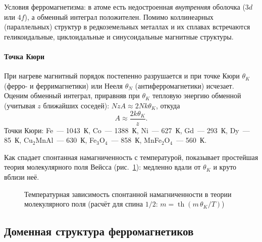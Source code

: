 \begin{glavnoe}
Условия ферромагнетизма: в атоме есть недостроенная \emph{внутренняя}
оболочка ($3d$ или $4f$), а обменный интеграл положителен. Помимо
коллинеарных (параллельных) структур в редкоземельных металлах и их
сплавах встречаются геликоидальные, циклоидальные и синусоидальные
магнитные структуры.
\end{glavnoe}

\paragraph{Точка Кюри}
При нагреве магнитный порядок постепенно разрушается и при точке Кюри
$\theta_K$ (ферро- и ферримагнетики) или Нееля $\theta_N$
(антиферромагнетики) исчезает. Оценим обменный интеграл, приравняв при
$\theta_K$ тепловую энергию обменной (учитывая $z$ ближайших соседей):
$NzA\approx2Nk\theta_K$, откуда
\begin{equation}\label{eq:A-curie}
A\approx\frac{2k\theta_K}z .
\end{equation}
Точки Кюри: Fe~— 1043~К, Co~— 1388~К, Ni~— 627~К, Gd~— 293~К, Dy~— 85~К,
Cu$_2$MnAl~— 630~К, Fe$_3$O$_4$~— 858~К, MnFe$_2$O$_4$~— 560~К.

Как спадает спонтанная намагниченность с температурой, показывает
простейшая теория молекулярного поля Вейсса (рис.~\ref{fig:Ms-T}):
медленно вдали от $\theta_K$ и круто вблизи неё.

\begin{figure}[ht]
\centering
{}
\caption{Температурная зависимость спонтанной намагниченности в теории
молекулярного поля (расчёт для спина $1/2$: $m=\operatorname{th}(m\,\theta_K/T)$)}
\label{fig:Ms-T}
\end{figure}

\subsection{Доменная структура ферромагнетиков}\label{ssec:domains}

